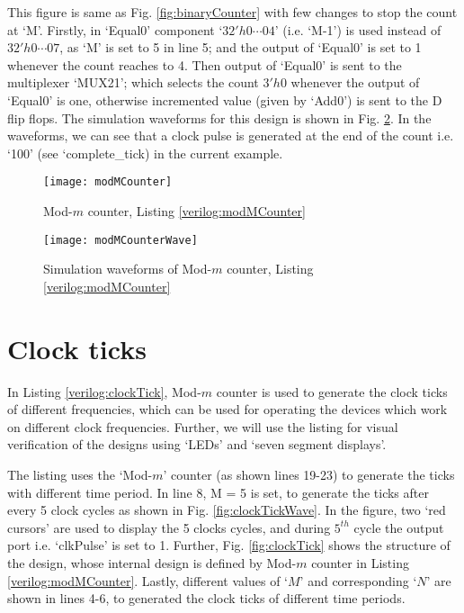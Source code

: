 \begin{explanation}
	This figure is same as Fig. \ref{fig:binaryCounter} with few changes to stop the count at `M'. Firstly, in `Equal0' component `$32'h0 \cdots 04$' (i.e. `M-1') is used instead of $32'h0 \cdots 07$, as `M' is set to 5 in line 5; and the output of `Equal0' is set to 1 whenever the count reaches to 4. Then output of `Equal0' is sent to the multiplexer `MUX21'; which selects the count $3'h0$ whenever the output of `Equal0' is one, otherwise incremented value (given by `Add0') is sent to the D flip flops. The simulation waveforms for this design is shown in Fig. \ref{fig:modMCounterWave}. In the waveforms, we can see that a clock pulse is generated at the end of the count i.e. `100' (see `complete\_tick) in the current example.
\end{explanation}
\begin{figure}[!h]
	\centering
	\texttt{[image: modMCounter]}
	\caption{Mod-$m$ counter, Listing \ref{verilog:modMCounter}}
	\label{fig:modMCounter}
\end{figure}

\begin{figure}[!h]
	\centering
	\texttt{[image: modMCounterWave]}
	\caption{Simulation waveforms of Mod-$m$ counter, Listing \ref{verilog:modMCounter}}
	\label{fig:modMCounterWave}
\end{figure}

\section{Clock ticks}
In Listing \ref{verilog:clockTick}, Mod-$m$ counter is used to generate the clock ticks of different frequencies, which can be used for operating the devices which work on different clock frequencies. Further, we will use the listing for visual verification of the designs using `LEDs' and `seven segment displays'.

\begin{explanation}
	The listing uses the `Mod-$m$' counter (as shown lines 19-23) to generate the ticks with different time period. In line 8, M = 5 is set, to generate the ticks after every 5 clock cycles as shown in Fig. \ref{fig:clockTickWave}. In the figure, two `red cursors' are used to display the 5 clocks cycles, and during $5^{th}$ cycle the output port i.e. `clkPulse' is set to 1. Further, Fig. \ref{fig:clockTick} shows the structure of the design, whose internal design is defined by Mod-$m$ counter in Listing \ref{verilog:modMCounter}. Lastly, different values of `$M$' and corresponding `$N$' are shown in lines 4-6, to generated the clock ticks of different time periods.
\end{explanation}

